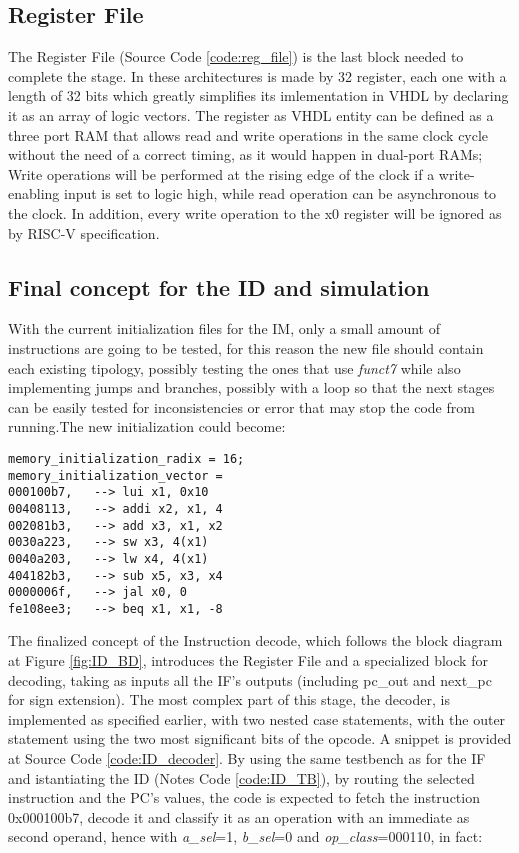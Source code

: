 \subsection{Register File}
The Register File (Source Code \ref{code:reg_file}) is the last block needed to complete the stage. In these architectures is made by 32 register, each one with a length of 32 bits which greatly simplifies its imlementation in VHDL by declaring it as an array of logic vectors.
The register as VHDL entity can be defined as a three port RAM that allows read and write operations in the same clock cycle without the need of a correct timing, as it would happen in dual-port RAMs; Write operations will be performed at the rising edge of the clock if a write-enabling input is set to logic high, while read operation can be asynchronous to the clock. In addition, every write operation to the x0 register will be ignored as by RISC-V specification.

\subsection{Final concept for the ID and simulation}
With the current initialization files for the IM, only a small amount of instructions are going to be tested, for this reason the new file should contain each existing tipology, possibly testing the ones that use \emph{funct7} while also implementing jumps and branches, possibly with a loop so that the next stages can be easily tested for inconsistencies or error that may stop the code from running.The new initialization could become:

\begin{verbatim}
memory_initialization_radix = 16;
memory_initialization_vector =
000100b7,   --> lui x1, 0x10
00408113,   --> addi x2, x1, 4
002081b3,   --> add x3, x1, x2
0030a223,   --> sw x3, 4(x1)
0040a203,   --> lw x4, 4(x1)
404182b3,   --> sub x5, x3, x4
0000006f,   --> jal x0, 0 
fe108ee3;   --> beq x1, x1, -8
\end{verbatim}

The finalized concept of the Instruction decode, which follows the block diagram at Figure \ref{fig:ID_BD}, introduces the Register File and a specialized block for decoding, taking as inputs all the IF's outputs (including {pc\_out} and {next\_pc} for sign extension).
The most complex part of this stage, the decoder, is implemented as specified earlier, with two nested case statements, with the outer statement using the two most significant bits of the opcode. A snippet is provided at Source Code \ref{code:ID_decoder}.
By using the same testbench as for the IF and istantiating the ID (Notes Code \ref{code:ID_TB}), by routing the selected instruction and the PC's values, the code is expected to fetch the instruction 0x000100b7, decode it and classify it as an operation with an immediate as second operand, hence with \emph{a{\_}sel}=1, \emph{b{\_}sel}=0 and \emph{op{\_}class}=000110, in fact:

